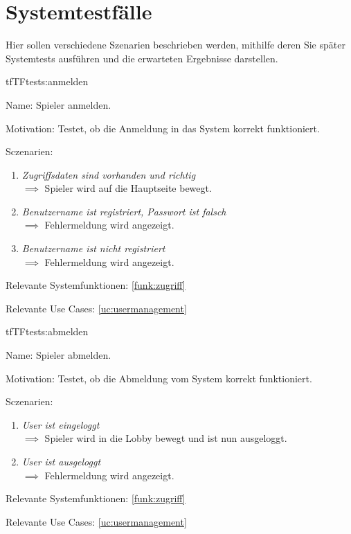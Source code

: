 \chapter{Systemtestfälle}

Hier sollen verschiedene Szenarien beschrieben werden, mithilfe deren Sie später Systemtests ausführen und die erwarteten Ergebnisse darstellen.

\setcounter{tf}{10}

\begin{description}[leftmargin=5em, style=sameline]

\begin{lhp}{tf}{TF}{tests:anmelden}
	\item [Name:] Spieler anmelden.
	\item [Motivation:] Testet, ob die Anmeldung in das System korrekt funktioniert.
	\item [Sczenarien:] \hfill
		\begin{enumerate}
			\item \textit{Zugriffsdaten sind vorhanden und richtig} \\ $\implies$ Spieler wird auf die Hauptseite bewegt.
			\item \textit{Benutzername ist registriert, Passwort ist falsch} \\ $\implies$ Fehlermeldung wird angezeigt.
			\item \textit{Benutzername ist nicht registriert} \\ $\implies$ Fehlermeldung wird angezeigt.
		\end{enumerate}
	\item [Relevante Systemfunktionen:] \ref{funk:zugriff}
	\item [Relevante Use Cases:] \ref{uc:usermanagement}
\end{lhp}

\begin{lhp}{tf}{TF}{tests:abmelden}
	\item [Name:] Spieler abmelden.
	\item [Motivation:] Testet, ob die Abmeldung vom System korrekt funktioniert.
	\item [Sczenarien:] \hfill
		\begin{enumerate}
			\item \textit{User ist eingeloggt} \\ $\implies$ Spieler wird in die Lobby bewegt und ist nun ausgeloggt.
			\item \textit{User ist ausgeloggt} \\ $\implies$ Fehlermeldung wird angezeigt.
		\end{enumerate}
	\item [Relevante Systemfunktionen:] \ref{funk:zugriff}
	\item [Relevante Use Cases:] \ref{uc:usermanagement}
\end{lhp}


\end{description}
